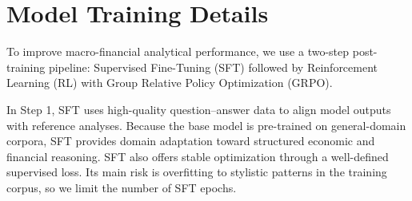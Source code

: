 \newcommand{\prompttag}[1]{\textcolor{blue}{\texttt{<|#1|>}}}

\section{Model Training Details}\label{ch2:sec:training}

To improve macro-financial analytical performance, we use a two-step post-training pipeline: Supervised Fine-Tuning (SFT) followed by Reinforcement Learning (RL) with Group Relative Policy Optimization (GRPO).

In Step 1, SFT uses high-quality question--answer data to align model outputs with reference analyses. Because the base model is pre-trained on general-domain corpora, SFT provides domain adaptation toward structured economic and financial reasoning. SFT also offers stable optimization through a well-defined supervised loss. Its main risk is overfitting to stylistic patterns in the training corpus, so we limit the number of SFT epochs.


